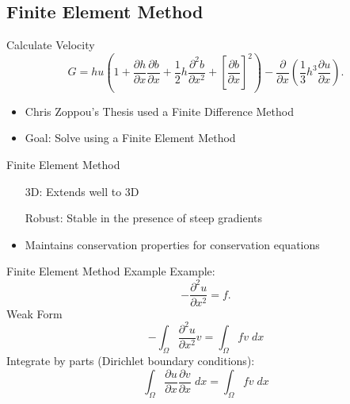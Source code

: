 \documentclass[handout]{beamer}
\begin{document}
\subsection{Finite Element Method}
\begin{frame}{Calculate Velocity}
		\[ G =  h {u} \left(1 + \frac{\partial h}{\partial x}\frac{\partial b}{\partial x} + \frac{1}{2}h\frac{\partial^2 b}{\partial x^2} + \left[\frac{\partial b}{\partial x}\right]^2 \right) - \frac{\partial}{\partial x}\left(\frac{1}{3}h^3  \frac{\partial {u}}{\partial x}\right).\]
		\pause
		\begin{itemize}
			\item Chris Zoppou's Thesis used a Finite Difference Method
			\item Goal: Solve using a Finite Element Method
		\end{itemize}
\end{frame}

\begin{frame}{Finite Element Method}
	\begin{itemize}
		\item[3D:] Extends well to 3D
		\item[Robust:] Stable in the presence of steep gradients 
		\item Maintains conservation properties for conservation equations
	\end{itemize}
\end{frame}

\begin{frame}{Finite Element Method Example}
	Example:
		\[  -\frac{\partial^2 {u}}{\partial x^2}= f.\]
	Weak Form
	\[
	 -\int_{\Omega }\frac{\partial^2 {u}}{\partial x^2} v = \int_{\Omega } f v \; dx
	\]
	Integrate by parts (Dirichlet boundary conditions):
	\[
  \int_{\Omega }\frac{\partial {u}}{\partial x} \frac{\partial {v}}{\partial x} \; dx  = \int_{\Omega } f v \; dx
	\]
\end{frame}
\end{document}
